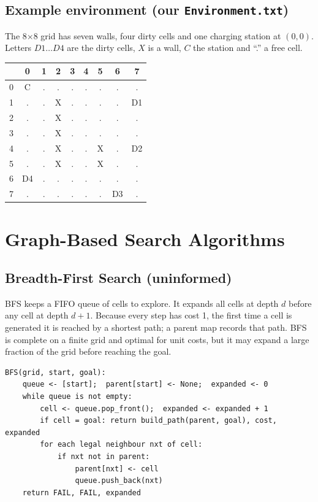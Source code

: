 \documentclass[11pt,a4paper]{article}
\newcommand{\code}[1]{\texttt{#1}}
\begin{document}
\subsection{Example environment (our \code{Environment.txt})}

The 8$\times$8 grid has seven walls, four dirty cells and one charging station at $(0,0)$.
Letters $D1\ldots D4$ are the dirty cells, $X$ is a wall, $C$ the station and ``.'' a free cell.

\begin{center}
\small
\begin{tabular}{c|cccccccc}
      & 0 & 1 & 2 & 3 & 4 & 5 & 6 & 7 \\ \hline
0 & C & . & . & . & . & . & . & . \\
1 & . & . & X & . & . & . & . & D1 \\
2 & . & . & X & . & . & . & . & . \\
3 & . & . & X & . & . & . & . & . \\
4 & . & . & X & . & . & X & . & D2 \\
5 & . & . & X & . & . & X & . & . \\
6 & D4& . & . & . & . & . & . & . \\
7 & . & . & . & . & . & . & D3& . \\
\end{tabular}
\end{center}

\section{Graph-Based Search Algorithms}

\subsection{Breadth-First Search (uninformed)}

BFS keeps a FIFO queue of cells to explore. It expands all cells at depth $d$ before any cell
at depth $d+1$. Because every step has cost 1, the first time a cell is generated it is reached
by a shortest path; a parent map records that path. BFS is complete on a finite grid and
optimal for unit costs, but it may expand a large fraction of the grid before reaching the goal.

\begin{verbatim}
BFS(grid, start, goal):
    queue <- [start];  parent[start] <- None;  expanded <- 0
    while queue is not empty:
        cell <- queue.pop_front();  expanded <- expanded + 1
        if cell = goal: return build_path(parent, goal), cost, expanded
        for each legal neighbour nxt of cell:
            if nxt not in parent:
                parent[nxt] <- cell
                queue.push_back(nxt)
    return FAIL, FAIL, expanded
\end{verbatim}
\end{document}
